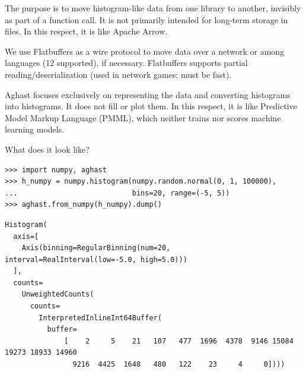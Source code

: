 \documentclass[aspectratio=169]{beamer}
\begin{document}
\begin{frame}{}
\vspace{1.25 cm}
\begin{description}\setlength{\itemsep}{0.5 cm}
\item[in-memory:] The purpose is to move histogram-like data from one library to another, invisibly as part of a function call. It is not primarily intended for long-term storage in files. In this respect, it is like Apache Arrow.

\item[serializable:]<2-> We use Flatbuffers as a wire protocol to move data over a network or among languages (12 supported), if necessary. Flatbuffers supports partial reading/deserialization (used in network games; must be fast).

\item[ontology:]<3-> Aghast focuses exclusively on representing the data and converting histograms into histograms. It does not fill or plot them. In this respect, it is like Predictive Model Markup Language (PMML), which neither trains nor scores machine learning models.
\end{description}
\end{frame}

\begin{frame}[fragile]{What does it look like?}
\small
\begin{verbatim}
>>> import numpy, aghast
>>> h_numpy = numpy.histogram(numpy.random.normal(0, 1, 100000),
...                           bins=20, range=(-5, 5))
>>> aghast.from_numpy(h_numpy).dump()
\end{verbatim}

\scriptsize
\begin{verbatim}
Histogram(
  axis=[
    Axis(binning=RegularBinning(num=20, interval=RealInterval(low=-5.0, high=5.0)))
  ],
  counts=
    UnweightedCounts(
      counts=
        InterpretedInlineInt64Buffer(
          buffer=
              [    2     5    21   107   477  1696  4378  9146 15084 19273 18933 14960
                9216  4425  1648   480   122    23     4     0])))
\end{verbatim}

\vspace{0.25 cm}
\end{frame}
\end{document}
